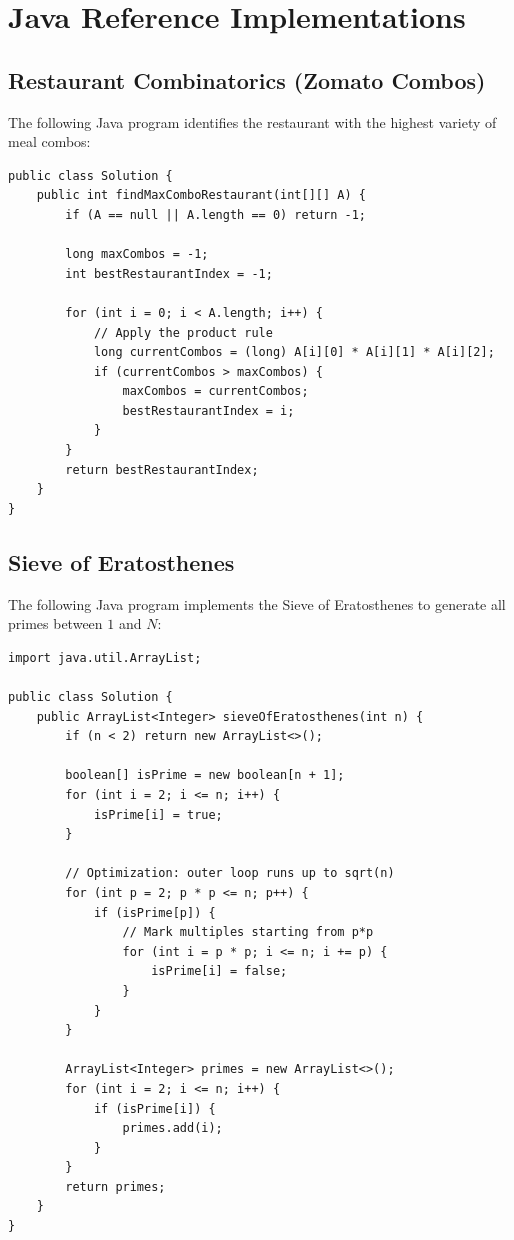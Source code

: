 \documentclass[10pt,journal,compsoc,onecolumn]{IEEEtran}
\begin{document}
\section{Java Reference Implementations}
\label{sec:code}

\subsection{Restaurant Combinatorics (Zomato Combos)}
The following Java program identifies the restaurant with the highest variety of meal combos:
\begin{verbatim}
public class Solution {
    public int findMaxComboRestaurant(int[][] A) {
        if (A == null || A.length == 0) return -1;
        
        long maxCombos = -1;
        int bestRestaurantIndex = -1;
        
        for (int i = 0; i < A.length; i++) {
            // Apply the product rule
            long currentCombos = (long) A[i][0] * A[i][1] * A[i][2];
            if (currentCombos > maxCombos) {
                maxCombos = currentCombos;
                bestRestaurantIndex = i;
            }
        }
        return bestRestaurantIndex;
    }
}
\end{verbatim}

\subsection{Sieve of Eratosthenes}
The following Java program implements the Sieve of Eratosthenes to generate all primes between $1$ and $N$:
\begin{verbatim}
import java.util.ArrayList;

public class Solution {
    public ArrayList<Integer> sieveOfEratosthenes(int n) {
        if (n < 2) return new ArrayList<>();

        boolean[] isPrime = new boolean[n + 1];
        for (int i = 2; i <= n; i++) {
            isPrime[i] = true;
        }

        // Optimization: outer loop runs up to sqrt(n)
        for (int p = 2; p * p <= n; p++) {
            if (isPrime[p]) {
                // Mark multiples starting from p*p
                for (int i = p * p; i <= n; i += p) {
                    isPrime[i] = false;
                }
            }
        }

        ArrayList<Integer> primes = new ArrayList<>();
        for (int i = 2; i <= n; i++) {
            if (isPrime[i]) {
                primes.add(i);
            }
        }
        return primes;
    }
}
\end{verbatim}
\end{document}
